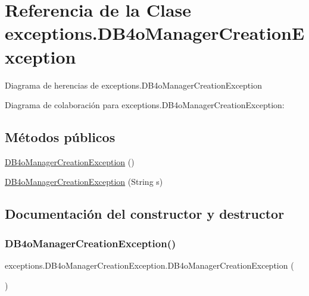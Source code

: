 \hypertarget{classexceptions_1_1_d_b4o_manager_creation_exception}{}\section{Referencia de la Clase exceptions.\+D\+B4o\+Manager\+Creation\+Exception}
\label{classexceptions_1_1_d_b4o_manager_creation_exception}


Diagrama de herencias de exceptions.\+D\+B4o\+Manager\+Creation\+Exception


Diagrama de colaboración para exceptions.\+D\+B4o\+Manager\+Creation\+Exception\+:
\subsection*{Métodos públicos}
\begin{DoxyCompactItemize}
\item 
\mbox{\hyperlink{classexceptions_1_1_d_b4o_manager_creation_exception_a5da5879180740606e8a3f1c2f88f01dc}{D\+B4o\+Manager\+Creation\+Exception}} ()
\item 
\mbox{\hyperlink{classexceptions_1_1_d_b4o_manager_creation_exception_a45281047a13292cbee85b6f04547adc5}{D\+B4o\+Manager\+Creation\+Exception}} (String s)
\end{DoxyCompactItemize}


\subsection{Documentación del constructor y destructor}
\mbox{\label{classexceptions_1_1_d_b4o_manager_creation_exception_a5da5879180740606e8a3f1c2f88f01dc}} 
\subsubsection{\texorpdfstring{DB4oManagerCreationException()}{DB4oManagerCreationException()}\hspace{0.1cm}{\footnotesize\ttfamily [1/2]}}
{\footnotesize\ttfamily exceptions.\+D\+B4o\+Manager\+Creation\+Exception.\+D\+B4o\+Manager\+Creation\+Exception (\begin{DoxyParamCaption}{ }\end{DoxyParamCaption})}

